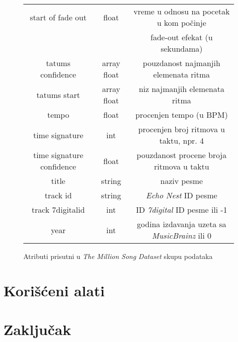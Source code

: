 \documentclass[a4paper]{article}
\begin{document}
\begin{figure}[!h]
\begin{tabular}{|c|c|c|}
        start of fade out & float & vreme u odnosu na pocetak u kom po\v{c}inje \\
        & & fade-out efekat (u sekundama) \\
        tatums confidence & array float & pouzdanost najmanjih elemenata ritma \\
        tatums start & array float & niz najmanjih elemenata ritma \\
        tempo & float & procenjen tempo (u BPM) \\
        time signature & int & procenjen broj ritmova u taktu, npr. 4 \\
        time signature confidence & float & pouzdanost procene broja ritmova u taktu \\
        title & string & naziv pesme \\
        track id & string & \emph{Echo Nest} ID pesme \\
        track 7digitalid & int & ID \emph{7digital} ID pesme ili -1 \\
        year & int & godina izdavanja uzeta sa \emph{MusicBrainz} ili 0 \\
        \hline
    \end{tabular}
    \label{Atributi}
    \caption{Atributi prisutni u \emph{The Million Song Dataset} skupu podataka}
\end{figure}


\section{Kori\v{s}\'c{}eni alati}
\label{sec:Alati}

\cite{KNIME}
\cite{SPSS}


\section{Zaključak}
\label{sec:Zakljucak}



\appendix



\end{document}
